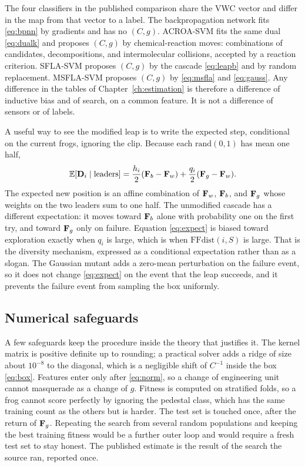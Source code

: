 The four classifiers in the published comparison share the VWC vector and differ in the map from that vector to a label.
The backpropagation network fits \eqref{eq:bpnn} by gradients and has no \((C, g)\).
ACROA-SVM fits the same dual \eqref{eq:dualk} and proposes \((C, g)\) by chemical-reaction moves: combinations of candidates, decompositions, and intermolecular collisions, accepted by a reaction criterion.
SFLA-SVM proposes \((C, g)\) by the cascade \eqref{eq:leapb} and by random replacement.
MSFLA-SVM proposes \((C, g)\) by \eqref{eq:msfla} and \eqref{eq:gauss}.
Any difference in the tables of Chapter~\ref{ch:estimation} is therefore a difference of inductive bias and of search, on a common feature.
It is not a difference of sensors or of labels.

A useful way to see the modified leap is to write the expected step, conditional on the current frogs, ignoring the clip.
Because each \(\mathrm{rand}(0,1)\) has mean one half,
\begin{equation}
\mathbb{E}[\mathbf{D}_{i}\mid \text{leaders}]
=\frac{h_{i}}{2}(\mathbf{F}_{b}-\mathbf{F}_{w})+\frac{q_{i}}{2}(\mathbf{F}_{g}-\mathbf{F}_{w}).
\label{eq:expect}
\end{equation}
The expected new position is an affine combination of \(\mathbf{F}_{w}\), \(\mathbf{F}_{b}\), and \(\mathbf{F}_{g}\) whose weights on the two leaders sum to one half.
The unmodified cascade has a different expectation: it moves toward \(\mathbf{F}_{b}\) alone with probability one on the first try, and toward \(\mathbf{F}_{g}\) only on failure.
Equation \eqref{eq:expect} is biased toward exploration exactly when \(q_{i}\) is large, which is when \(\mathrm{FFdist}(i, S)\) is large.
That is the diversity mechanism, expressed as a conditional expectation rather than as a slogan.
The Gaussian mutant adds a zero-mean perturbation on the failure event, so it does not change \eqref{eq:expect} on the event that the leap succeeds, and it prevents the failure event from sampling the box uniformly.

\subsection{Numerical safeguards}

A few safeguards keep the procedure inside the theory that justifies it.
The kernel matrix is positive definite up to rounding; a practical solver adds a ridge of size about \(10^{-8}\) to the diagonal, which is a negligible shift of \(C^{-1}\) inside the box \eqref{eq:box}.
Features enter only after \eqref{eq:norm}, so a change of engineering unit cannot masquerade as a change of \(g\).
Fitness is computed on stratified folds, so a frog cannot score perfectly by ignoring the pedestal class, which has the same training count as the others but is harder.
The test set is touched once, after the return of \(\mathbf{F}_{g}\).
Repeating the search from several random populations and keeping the best training fitness would be a further outer loop and would require a fresh test set to stay honest.
The published estimate is the result of the search the source ran, reported once.

